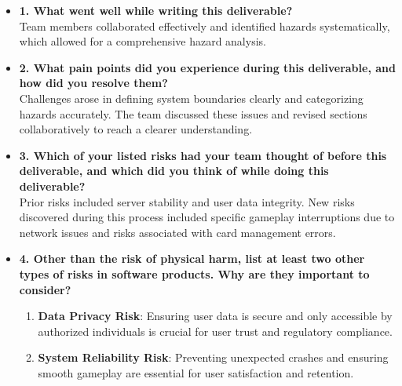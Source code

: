 \documentclass{article}
\begin{document}
\begin{itemize}
    \item \textbf{1. What went well while writing this deliverable?}\\
    Team members collaborated effectively and identified hazards systematically, which allowed for a comprehensive hazard analysis.

    \item \textbf{2. What pain points did you experience during this deliverable, and how did you resolve them?}\\
    Challenges arose in defining system boundaries clearly and categorizing hazards accurately. The team discussed these issues and revised sections collaboratively to reach a clearer understanding.

    \item \textbf{3. Which of your listed risks had your team thought of before this deliverable, and which did you think of while doing this deliverable?}\\
    Prior risks included server stability and user data integrity. New risks discovered during this process included specific gameplay interruptions due to network issues and risks associated with card management errors.

    \item \textbf{4. Other than the risk of physical harm, list at least two other types of risks in software products. Why are they important to consider?}\\
    \begin{enumerate}
        \item \textbf{Data Privacy Risk}: Ensuring user data is secure and only accessible by authorized individuals is crucial for user trust and regulatory compliance.
        \item \textbf{System Reliability Risk}: Preventing unexpected crashes and ensuring smooth gameplay are essential for user satisfaction and retention.
    \end{enumerate}
\end{itemize}
\end{document}
